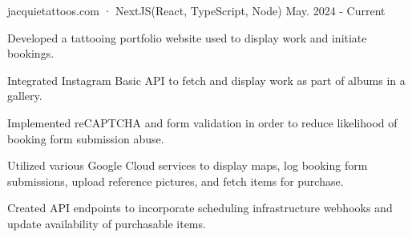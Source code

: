 

\begin{cventries}

\cventry
  {jacquietattoos.com · NextJS(React, TypeScript, Node)} %
  {}
  {}
  {May. 2024 - Current} %
  {
    \begin{cvitems} %
      \item {Developed a tattooing portfolio website used to display work and initiate bookings.}
      \item {Integrated Instagram Basic API to fetch and display work as part of albums in a gallery.}
      \item {Implemented reCAPTCHA and form validation in order to reduce likelihood of booking form submission abuse.}
      \item {Utilized various Google Cloud services to display maps, log booking form submissions, upload reference pictures, and fetch items for purchase.}
      \item {Created API endpoints to incorporate scheduling infrastructure webhooks and update availability of purchasable items.}
    \end{cvitems}
  }
\end{cventries}
